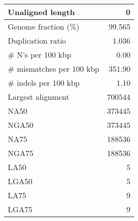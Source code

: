 \documentclass[12pt,a4paper]{article}
\begin{document}
\begin{table}[ht]
\begin{center}
\begin{tabular}{|l*{1}{|r}|}
Unaligned length & 0 \\ \hline
Genome fraction (\%) & 99.565 \\ \hline
Duplication ratio & 1.036 \\ \hline
\# N's per 100 kbp & 0.00 \\ \hline
\# mismatches per 100 kbp & 351.90 \\ \hline
\# indels per 100 kbp & 1.10 \\ \hline
Largest alignment & 700544 \\ \hline
NA50 & 373445 \\ \hline
NGA50 & 373445 \\ \hline
NA75 & 188536 \\ \hline
NGA75 & 188536 \\ \hline
LA50 & 5 \\ \hline
LGA50 & 5 \\ \hline
LA75 & 9 \\ \hline
LGA75 & 9 \\ \hline
\end{tabular}
\end{center}
\end{table}
\end{document}
